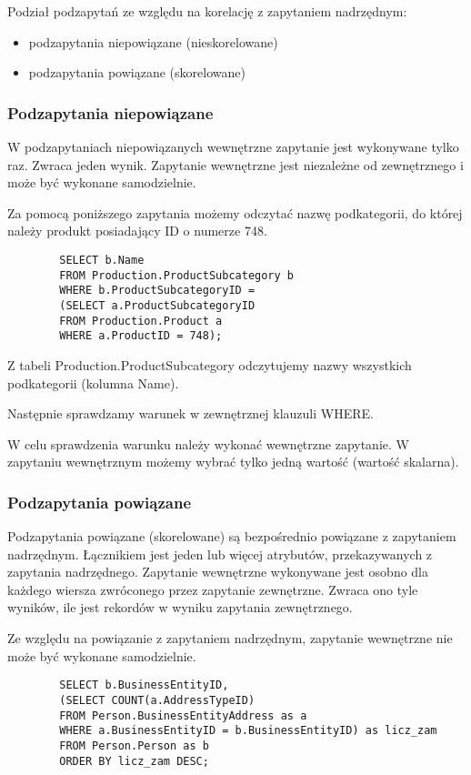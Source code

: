\documentclass[main.tex]{subfiles}
\begin{document}
    Podział podzapytań ze względu na korelację z zapytaniem nadrzędnym:
    \begin{itemize}
        \item podzapytania niepowiązane (nieskorelowane)
        \item podzapytania powiązane (skorelowane)
    \end{itemize}

    \subsubsection{Podzapytania niepowiązane}
    W podzapytaniach niepowiązanych wewnętrzne zapytanie jest wykonywane tylko raz. Zwraca jeden wynik. Zapytanie wewnętrzne jest niezależne od zewnętrznego i może być wykonane samodzielnie.

    Za pomocą poniższego zapytania możemy odczytać nazwę podkategorii, do której należy produkt posiadający ID o numerze 748.
    \begin{verbatim}
        SELECT b.Name
        FROM Production.ProductSubcategory b
        WHERE b.ProductSubcategoryID =
        (SELECT a.ProductSubcategoryID
        FROM Production.Product a
        WHERE a.ProductID = 748);
    \end{verbatim}

    Z tabeli Production.ProductSubcategory odczytujemy nazwy wszystkich podkategorii (kolumna Name).

    Następnie sprawdzamy warunek w zewnętrznej klauzuli WHERE.

    W celu sprawdzenia warunku należy wykonać wewnętrzne zapytanie. W zapytaniu wewnętrznym możemy wybrać tylko jedną wartość (wartość skalarna).

    \subsubsection{Podzapytania powiązane}

    Podzapytania powiązane (skorelowane) są bezpośrednio powiązane z zapytaniem nadrzędnym. Łącznikiem jest jeden lub więcej atrybutów, przekazywanych z zapytania nadrzędnego. Zapytanie wewnętrzne wykonywane jest osobno dla każdego wiersza zwróconego przez zapytanie zewnętrzne. Zwraca ono tyle wyników, ile jest rekordów w wyniku zapytania zewnętrznego.

    Ze względu na powiązanie z zapytaniem nadrzędnym, zapytanie wewnętrzne nie może być wykonane samodzielnie.
    \begin{verbatim}
        SELECT b.BusinessEntityID,
        (SELECT COUNT(a.AddressTypeID)
        FROM Person.BusinessEntityAddress as a
        WHERE a.BusinessEntityID = b.BusinessEntityID) as licz_zam
        FROM Person.Person as b
        ORDER BY licz_zam DESC;
    \end{verbatim}
\end{document}

